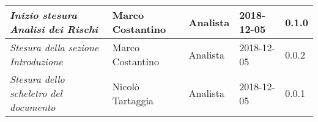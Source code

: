 \begin{table}[H]
\begin{tabular}{p{4cm}|C{3cm}|C{3cm}|R{2.5cm}|R{2cm}}
		\emph{\textit{Inizio stesura Analisi dei Rischi}} & Marco Costantino & Analista & 2018-12-05 & 0.1.0 \\
		\hline
		
		\emph{Stesura della sezione Introduzione} & Marco Costantino & Analista & 2018-12-05 & 0.0.2 \\
		\hline
		
		\emph{Stesura dello scheletro del documento} & Nicolò Tartaggia & Analista & 2018-12-05 & 0.0.1 \\
		
	\end{tabular}
	
\end{table}


\clearpage